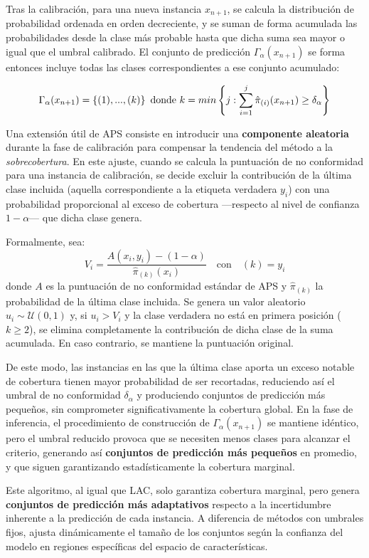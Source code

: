 Tras la calibración, para una nueva instancia $x_{n+1}$, se calcula la distribución de probabilidad ordenada en orden decreciente, y se suman de forma acumulada las probabilidades desde la clase más probable hasta que dicha suma sea mayor o igual que el umbral calibrado. El conjunto de predicción $\Gamma_\alpha(x_{n+1})$ se forma entonces incluye todas las clases correspondientes a ese conjunto acumulado: 

$$
\Gamma_\alpha(x_{n+1}) = \left\{ (1),...,(k) \right\} \\ \textnormal{ donde } 
k = min\left\{ j: \sum_{i=1}^{j} \hat{\pi}_{(i)}(x_{n+1}) \ge \delta_\alpha \right\} 
$$

Una extensión útil de APS consiste en introducir una \textbf{componente aleatoria} durante la fase de calibración para compensar la tendencia del método a la \textit{sobrecobertura}. En este ajuste, cuando se calcula la puntuación de no conformidad para una instancia de calibración, se decide excluir la contribución de la última clase incluida (aquella correspondiente a la etiqueta verdadera $y_i$) con una probabilidad proporcional al exceso de cobertura ---respecto al nivel de confianza $1-\alpha$--- que dicha clase genera.

Formalmente, sea:
$$
V_i = \frac{A(x_i, y_i) - (1-\alpha)}{\hat{\pi}_{(k)}(x_i)} \quad \text{con} \quad (k) = y_i
$$
donde $A$ es la puntuación de no conformidad estándar de APS y $\hat{\pi}_{(k)}$ la probabilidad de la última clase incluida.  
Se genera un valor aleatorio $u_i \sim \mathcal{U}(0,1)$ y, si $u_i > V_i$ y la clase verdadera no está en primera posición ($k \ge 2$), se elimina completamente la contribución de dicha clase de la suma acumulada. En caso contrario, se mantiene la puntuación original.

De este modo, las instancias en las que la última clase aporta un exceso notable de cobertura tienen mayor probabilidad de ser recortadas, reduciendo así el umbral de no conformidad $\delta_\alpha$ y produciendo conjuntos de predicción más pequeños, sin comprometer significativamente la cobertura global. En la fase de inferencia, el procedimiento de construcción de $\Gamma_\alpha(x_{n+1})$ se mantiene idéntico, pero el umbral reducido provoca que se necesiten menos clases para alcanzar el criterio, generando así \textbf{conjuntos de predicción más pequeños} en promedio, y que siguen garantizando estadísticamente la cobertura marginal.

Este algoritmo, al igual que LAC, solo garantiza cobertura marginal, pero genera \textbf{conjuntos de predicción más adaptativos} respecto a la incertidumbre inherente a la predicción de cada instancia. A diferencia de métodos con umbrales fijos, ajusta dinámicamente el tamaño de los conjuntos según la confianza del modelo en regiones específicas del espacio de características.

